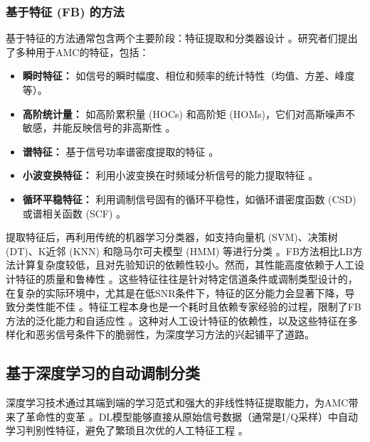 \documentclass[conference]{IEEEtran}
\begin{document}
\subsubsection{基于特征 (FB) 的方法}
基于特征的方法通常包含两个主要阶段：特征提取和分类器设计 \cite{[5]}\cite{[10]}。研究者们提出了多种用于AMC的特征，包括：
\begin{itemize}
    \item \textbf{瞬时特征：} 如信号的瞬时幅度、相位和频率的统计特性（均值、方差、峰度等）\cite{[27_MISSING]}。
    \item \textbf{高阶统计量：} 如高阶累积量 (HOCs) 和高阶矩 (HOMs)，它们对高斯噪声不敏感，并能反映信号的非高斯性 \cite{[10]}\cite{[27_MISSING]}。
    \item \textbf{谱特征：} 基于信号功率谱密度提取的特征 \cite{[27_MISSING]}。
    \item \textbf{小波变换特征：} 利用小波变换在时频域分析信号的能力提取特征 \cite{[27_MISSING]}。
    \item \textbf{循环平稳特征：} 利用调制信号固有的循环平稳性，如循环谱密度函数 (CSD) 或谱相关函数 (SCF) \cite{[5]}。
\end{itemize}
提取特征后，再利用传统的机器学习分类器，如支持向量机 (SVM)、决策树 (DT)、K近邻 (KNN) 和隐马尔可夫模型 (HMM) 等进行分类 \cite{[5]}\cite{[10]}\cite{[33_MISSING]}。FB方法相比LB方法计算复杂度较低，且对先验知识的依赖性较小。然而，其性能高度依赖于人工设计特征的质量和鲁棒性 \cite{[9_MISSING]}\cite{[31_MISSING]}。这些特征往往是针对特定信道条件或调制类型设计的，在复杂的实际环境中，尤其是在低SNR条件下，特征的区分能力会显著下降，导致分类性能不佳 \cite{[5]}\cite{[10]}。特征工程本身也是一个耗时且依赖专家经验的过程，限制了FB方法的泛化能力和自适应性 \cite{[9_MISSING]}\cite{[10]}。这种对人工设计特征的依赖性，以及这些特征在多样化和恶劣信号条件下的脆弱性，为深度学习方法的兴起铺平了道路。

\subsection{基于深度学习的自动调制分类}
深度学习技术通过其端到端的学习范式和强大的非线性特征提取能力，为AMC带来了革命性的变革 \cite{[10]}\cite{b4}\cite{[12]}。DL模型能够直接从原始信号数据（通常是I/Q采样）中自动学习判别性特征，避免了繁琐且次优的人工特征工程 \cite{[10]}\cite{[12]}。
\end{document}
